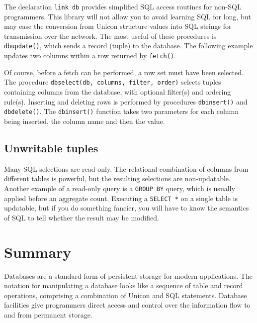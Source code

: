 The declaration \texttt{link db} provides simplified SQL access routines
for non-SQL programmers.
This library will not allow you to avoid learning SQL for long,
but may ease the conversion from Unicon structure values into SQL
strings for transmission over the network.
The most useful of these procedures is \texttt{dbupdate()}, which sends
a record (tuple) to the database. The following example updates two
columns within a row returned by \texttt{fetch()}.


Of course, before a fetch can be performed, a row set must have been
selected. The procedure \texttt{dbselect(db, columns, filter, order)}
selects tuples containing columns from the database, with optional
filter(s) and ordering rule(s).
Inserting and deleting rows is performed by procedures
\texttt{dbinsert()} and \texttt{dbdelete()}. The \texttt{dbinsert()}
function takes two parameters for each column being inserted, the
column name and then the value.

\subsection*{Unwritable tuples}

Many SQL selections are read-only.  The relational combination of
columns from different tables is powerful, but the resulting
selections are non-updatable.  Another example of a read-only query is
a \texttt{GROUP BY} query, which is usually applied before an
aggregate count. Executing a \texttt{SELECT *} on a single table is
updatable, but if you do something fancier, you will have to know the
semantics of SQL to tell whether the result may be modified.

\section{Summary}

Databases are a standard form of persistent storage for modern
applications. The notation for manipulating a database looks like
a sequence of table and record operations, comprising a
combination of Unicon and SQL statements. Database
facilities give programmers direct access and control over the
information flow to and from permanent storage.
